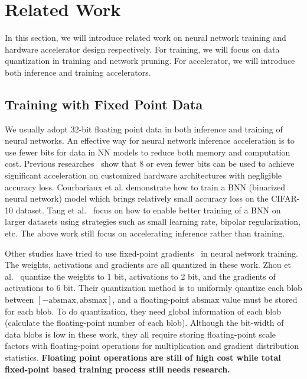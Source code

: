 \section{Related Work}\label{sec:related_work}
In this section, we will introduce related work on neural network training and hardware accelerator design respectively. For training, we will focus on data quantization in training and network pruning. For accelerator, we will introduce both inference and training accelerators.

\subsection{Training with Fixed Point Data}
We usually adopt 32-bit floating point data in both inference and training of neural networks. An effective way for neural network inference acceleration is to use fewer bits for data in NN models to reduce both memory and computation cost. Previous researches~\cite{han2016eie,qiu2016going} show that 8 or even fewer bits can be used to achieve significant acceleration on customized hardware architectures with negligible accuracy loss. Courbariaux et al.\cite{hubara2016binarized} demonstrate how to train a BNN (binarized neural network) model which brings relatively small accuracy loss on the CIFAR-10 dataset. Tang et al.~\cite{tang2017train} focus on how to enable better training of a BNN on larger datasets using strategies such as small learning rate, bipolar regularization, etc. The above work still focus on accelerating inference rather than training.

Other studies have tried to use fixed-point gradients~\cite{hubara2016binarized, hubara2017quantized, zhou2016dorefa} in neural network training. The weights, activations and gradients are all quantized in these work. Zhou et al.~\cite{zhou2016dorefa} quantize the weights to 1 bit, activations to 2 bit, and the gradients of activations to 6 bit. Their quantization method is to uniformly quantize each blob between $[-\mbox{absmax}, \mbox{absmax}]$, and a floating-point $\mbox{absmax}$ value must be stored for each blob. To do quantization, they need global information of each blob (calculate the floating-point number of each blob). Although the bit-width of data blobs is low in these work, they all require storing floating-point scale factors with floating-point operations for multiplication and gradient distribution statistics. {\bf{Floating point operations are still of high cost while total fixed-point based training process still needs research.}}


